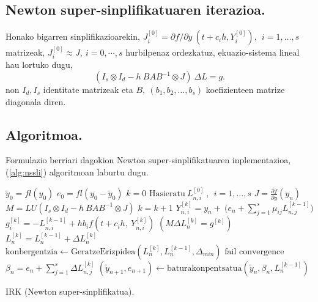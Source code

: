 \subsection*{Newton super-sinplifikatuaren iterazioa.}

Honako bigarren sinplifikazioarekin, $J_i^{[0]}=\partial f / \partial y \ (t+c_ih, Y_i^{[0]}), \ \  i=1,\dots,s$ matrizeak,  $J_i^{[0]} \approx J, \ i=0,\cdots,s$ hurbilpenaz ordezkatuz, ekuazio-sistema lineal hau lortuko dugu,
\begin{equation}
\label{eq:nsseq2}
(I_s \otimes I_d - h \ BAB^{-1} \otimes J) \ \Delta L = g. 
\end{equation}
non $I_d, I_s$ identitate matrizeak eta $B, \ (b_1,b_2,\dots,b_s)$ koefizienteen matrize diagonala diren.  

\subsection*{Algoritmoa.}

Formulazio berriari dagokion Newton super-sinplifikatuaren inplementazioa, (\ref{alg:nssli}) algoritmoan laburtu dugu.

\begin{algorithm}[H]
 \BlankLine
  $\tilde{y}_0=fl(y_0)$\;
  $e_0=fl(y_0-\tilde{y}_0)$\;
  {
   \BlankLine
   $k=0$\;
   $\text{Hasieratu} \ L_{n,i}^{[0]} \ , \ \ i=1,\dots,s $\;
   \BlankLine
   $J=\frac{\partial f}{\partial y}(y_n) $\; 
   $M=LU(I_s \otimes I_d - h \ BAB^{-1} \otimes J)$\;
   \BlankLine
   {
    \BlankLine 
    $k=k+1$\;
    $Y_{n,i}^{[k]}=y_{n} + \ \big(e_n+\sum\limits_{j=1}^{s} \mu_{ij} L_{n,j}^{[k-1]}\big)  $\;
    $g_i^{[k]}=-L_{n,i}^{[k-1]}+h b_i f(t+c_ih,\ Y_{n,i}^{[k]})$\;
     $(M \Delta L_n^{[k]}=g^{[k]})$\;
    $L_n^{[k]}=L_n^{[k-1]}+\Delta L_n^{[k]}$\;
    $\text{konbergentzia} \leftarrow \text{GeratzeErizpidea}(L_n^{[k]},L_n^{[k-1]},\Delta_{min}) $\;
   }
   \BlankLine
   {
    {$\text{fail convergence}$\;}
   }
   $\beta_{n}={e}_{n} + \sum\limits_{j=1}^{s}\Delta L_{n,j}^{[k]}$\;
   $(\tilde y_{n+1}, e_{n+1})\leftarrow \text{baturakonpentsatua}(\tilde y_{n},\beta_{n},L_{n}^{[k-1]})$\;
 }
 \caption{IRK (Newton super-sinplifikatua).}
 \label{alg:nssli}
\end{algorithm}



